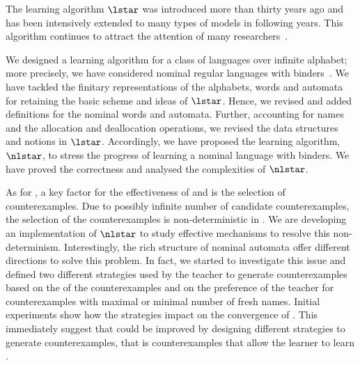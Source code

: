 The learning algorithm $\lstar$ was introduced more than thirty years
ago and has been intensively extended to many types of models in
following years. This algorithm continues to attract the attention of
many researchers~\cite{Angluin17,SchroderKMW17,Moerman17}.

We designed a learning algorithm for a class of languages over
infinite alphabet; more precisely, we have considered nominal regular
languages with binders~\cite{Kurz0T12,Kurz0T13}.
%
We have tackled the finitary representations of the alphabets, words
and automata for retaining the basic scheme and ideas of
$\lstar$. Hence, we revised and added definitions for the nominal
words and automata.
%
Further, accounting for names and the allocation and deallocation
operations, we revised the data structures and notions in
$\lstar$. Accordingly, we have proposed the learning algorithm,
$\nlstar$, to stress the progress of learning a nominal language with
binders. We have proved the correctness and analysed the complexities
of $\nlstar$.

As for \lstar, a key factor for the effectiveness of and \nlstar is
the selection of counterexamples.
%
%
Due to possibly infinite number of candidate counterexamples, the
selection of the counterexamples is non-deterministic in \nlstar.
%
We are developing an implementation of $\nlstar$ to study effective
mechanisms to resolve this non-determinism.
%
Interestingly, the rich structure of nominal automata offer different
directions to solve this problem.
%
In fact, we started to investigate this issue and defined two
different strategies used by the teacher to generate counterexamples
based on the  of the counterexamples and on the preference
of the teacher for counterexamples with maximal or minimal number of
fresh names.
%
Initial experiments show how the strategies impact on the
convergence of \nlstar.
%
This immediately suggest that \nlstar could be improved by designing
different strategies to generate  counterexamples, that is
counterexamples that allow the learner to learn .
